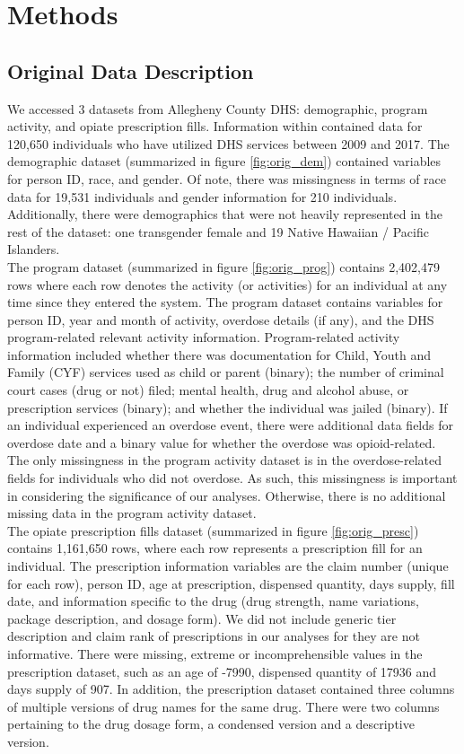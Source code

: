 \documentclass[twoside,10.5pt]{article}
\begin{document}
\section{Methods}
\subsection{Original Data Description}
We accessed 3 datasets from Allegheny County DHS: demographic, program activity, and opiate prescription fills. Information within contained data for 120,650 individuals who have utilized DHS services between 2009 and 2017. The demographic dataset (summarized in figure \ref{fig:orig_dem}) contained variables for person ID, race, and gender. Of note, there was missingness in terms of race data for 19,531 individuals and gender information for 210 individuals. Additionally, there were demographics that were not heavily represented in the rest of the dataset: one transgender female and 19 Native Hawaiian / Pacific Islanders. \\

The program dataset (summarized in figure \ref{fig:orig_prog}) contains 2,402,479 rows where each row denotes the activity (or activities) for an individual at any time since they entered the system. The program dataset contains variables for person ID, year and month of activity, overdose details (if any), and the DHS program-related relevant activity information. Program-related activity information included whether there was documentation for Child, Youth and Family (CYF) services used as child or parent (binary); the number of criminal court cases (drug or not) filed; mental health, drug and alcohol abuse, or prescription services (binary); and whether the individual was jailed (binary). If an individual experienced an overdose event, there were additional data fields for overdose date and a binary value for whether the overdose was opioid-related. The only missingness in the program activity dataset is in the overdose-related fields for individuals who did not overdose. As such, this missingness is important in considering the significance of our analyses. Otherwise, there is no additional missing data in the program activity dataset. \\

The opiate prescription fills dataset (summarized in figure \ref{fig:orig_presc}) contains 1,161,650 rows, where each row represents a prescription fill for an individual. The prescription information variables are the claim number (unique for each row), person ID, age at prescription, dispensed quantity, days supply, fill date, and information specific to the drug (drug strength, name variations, package description, and dosage form). We did not include generic tier description and claim rank of prescriptions in our analyses for they are not informative. There were missing, extreme or incomprehensible values in the prescription dataset, such as an age of -7990, dispensed quantity of 17936 and days supply of 907. In addition, the prescription dataset contained three columns of  multiple versions of drug names for the same drug. There were two columns pertaining to the drug dosage form, a condensed version and a descriptive version.
\end{document}
